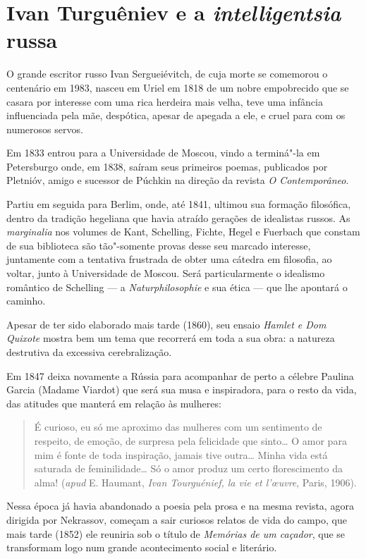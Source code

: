 \chapter{Ivan Turguêniev e a \emph{intelligentsia} russa}


O grande escritor russo Ivan Sergueiévitch, de cuja morte se comemorou o
centenário em 1983, nasceu em Uriel em 1818 de um nobre empobrecido que se casara por interesse com uma rica
herdeira mais velha, teve uma infância influenciada pela mãe, despótica,
apesar de apegada a ele, e cruel para com os numerosos servos.

Em 1833 entrou para a Universidade de Moscou, vindo a terminá"-la em
Petersburgo onde, em 1838, saíram seus primeiros poemas, publicados por
Pletnióv, amigo e sucessor de Púchkin na direção da revista \emph{O
Contemporâneo}.

Partiu em seguida para Berlim, onde, até 1841, ultimou sua formação
filosófica, dentro da tradição hegeliana que havia atraído gerações de
idealistas russos. As \emph{marginalia} nos volumes de Kant, Schelling,
Fichte, Hegel e Fuerbach que constam de sua biblioteca são tão"-somente
provas desse seu marcado interesse, juntamente com a tentativa frustrada
de obter uma cátedra em filosofia, ao voltar, junto à Universidade de
Moscou. Será particularmente o idealismo romântico de Schelling --- a
\emph{Naturphilosophie} e sua ética --- que lhe apontará o caminho.

Apesar de ter sido elaborado mais tarde (1860), seu ensaio \emph{Hamlet e Dom
Quixote} mostra bem um tema que recorrerá em toda a sua obra: a natureza
destrutiva da excessiva cerebralização.

Em 1847 deixa novamente a Rússia para acompanhar de perto a célebre
Paulina Garcia (Madame Viardot) que será sua musa e inspiradora, para o
resto da vida, das atitudes que manterá em relação às mulheres:

\begin{quote}
É curioso, eu só me aproximo das mulheres com um sentimento de
respeito, de emoção, de surpresa pela felicidade que sinto\ldots{} O amor para
mim é fonte de toda inspiração, jamais tive outra\ldots{} Minha vida está
saturada de feminilidade\ldots{} Só o amor produz um certo florescimento da
alma! (\emph{apud} E. Haumant, \emph{Ivan Tourguénief, la vie et l'œuvre},
Paris, 1906).
\end{quote}

Nessa época já havia abandonado a poesia pela prosa e na mesma revista,
agora dirigida por Nekrassov, começam a sair curiosos relatos de vida do
campo, que mais tarde (1852) ele reuniria sob o título de \emph{Memórias
de um caçador}, que se transformam logo num grande acontecimento social
e literário.

